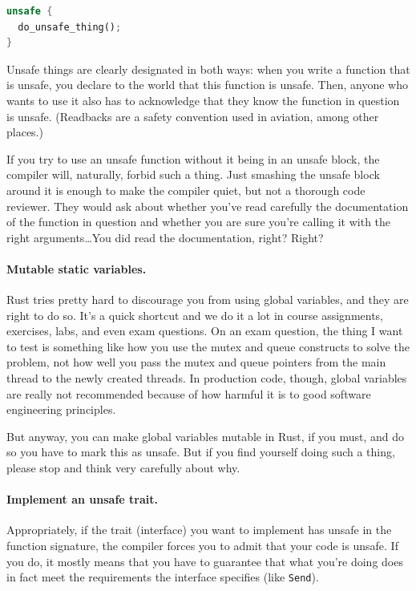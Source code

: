 \documentclass[a4paper]{report}
\begin{document}
\begin{lstlisting}[language=Rust]
unsafe {
  do_unsafe_thing();
}
\end{lstlisting}

Unsafe things are clearly designated in both ways: when you write a function that is unsafe, you declare to the world that this function is unsafe. Then, anyone who wants to use it also has to acknowledge that they know the function in question is unsafe. (Readbacks are a safety convention used in aviation, among other places.)

If you try to use an unsafe function without it being in an unsafe block, the compiler will, naturally, forbid such a thing. Just smashing the unsafe block around it is enough to make the compiler quiet, but not a thorough code reviewer. They would ask about whether you've read carefully the documentation of the function in question and whether you are sure you're calling it with the right arguments\ldots You did read the documentation, right? Right?

\paragraph{Mutable static variables.} Rust tries pretty hard to discourage you from using global variables, and they are right to do so. It's a quick shortcut and we do it a lot in course assignments, exercises, labs, and even exam questions. On an exam question, the thing I want to test is something like how you use the mutex and queue constructs to solve the problem, not how well you pass the mutex and queue pointers from the main thread to the newly created threads. In production code, though, global variables are really not recommended because of how harmful it is to good software engineering principles. 

But anyway, you can make global variables mutable in Rust, if you must, and do so you have to mark this as unsafe. But if you find yourself doing such a thing, please stop and think very carefully about why.

\paragraph{Implement an unsafe trait.} Appropriately, if the trait (interface) you want to implement has unsafe in the function signature, the compiler forces you to admit that your code is unsafe. If you do, it mostly means that you have to guarantee that what you're doing does in fact meet the requirements the interface specifies (like \texttt{Send}).
\end{document}
